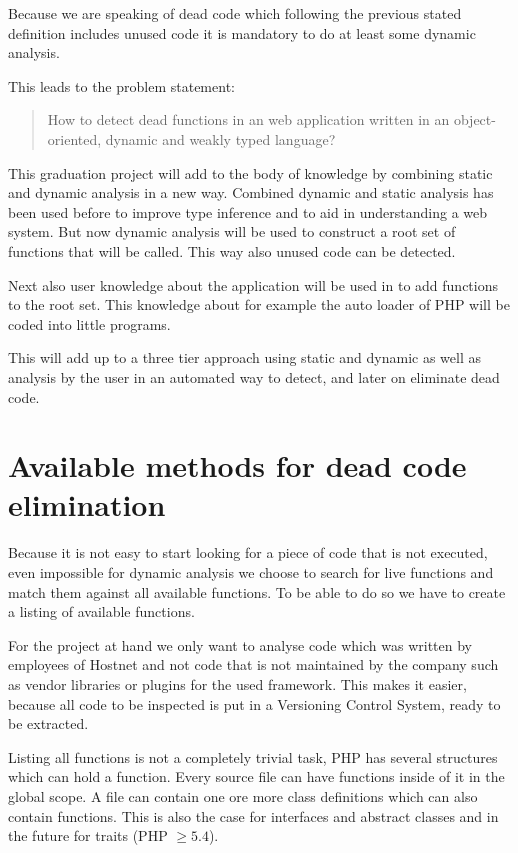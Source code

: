 \documentclass[a4paper,10pt,twocolumn]{article}
\begin{document}
Because we are speaking of dead code which following the previous stated definition includes unused code it is mandatory to do at least some dynamic analysis.

This leads to the problem statement:

\begin{quote}
How to detect dead functions in an web application written in an object-oriented, dynamic and weakly typed language?
\end{quote}

This graduation project will add to the body of knowledge by combining static and dynamic analysis in a new way. Combined dynamic and static analysis has been used before to improve type inference\cite{chang2007} and to aid in understanding a web system\cite{lucca2005}. But now dynamic analysis will be used to construct a root set of functions that will be called. This way also unused code can be detected.

Next also user knowledge about the application will be used in to add functions to the root set. This knowledge about for example the auto loader of PHP will be coded into little programs.

This will add up to a three tier approach using static and dynamic as well as analysis by the user in an automated way to detect, and later on eliminate dead code.

\section{Available methods for dead code elimination}
Because it is not easy to start looking for a piece of code that is not executed, even impossible for dynamic analysis we choose to search for live functions and match them against all available functions. To be able to do so we have to create a listing of available functions.

For the project at hand we only want to analyse code which was written by employees of Hostnet and not code that is not maintained by the company such as vendor libraries or plugins for the used framework. This makes it easier, because all code to be inspected is put in a Versioning Control System, ready to be extracted.

Listing all functions is not a completely trivial task, PHP has several structures which can hold a function. Every source file can have functions inside of it in the global scope. A file can contain one ore more class definitions which can also contain functions. This is also the case for interfaces and abstract classes and in the future for traits (PHP $\geq 5.4$).
\end{document}
